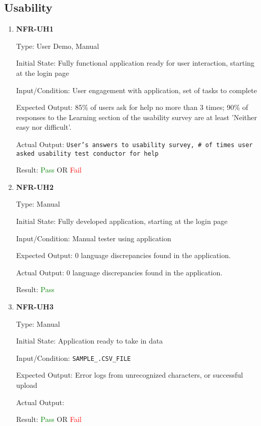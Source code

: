 \documentclass[12pt, titlepage]{article}
\begin{document}
\subsection{Usability}
\begin{enumerate}
\item{\textbf{NFR-UH1}} \label{NFR:UH1}

Type: User Demo, Manual

Initial State: Fully functional application ready for user interaction, starting
at the login page

Input/Condition: User engagement with application, set of tasks to complete

Expected Output: 85\% of users ask for help no more than 3 times; 90\% of
responses to the Learning section of the usability survey are at least 'Neither
easy nor difficult'.

Actual Output: \texttt{User's answers to usability survey, \# of times user
asked usability test conductor for help}

Result: \textcolor{green}{Pass} OR \textcolor{red}{Fail}

\item{\textbf{NFR-UH2}} \label{NFR:UH2}

Type: Manual
  
Initial State: Fully developed application, starting at the login page
  
Input/Condition: Manual tester using application

Expected Output: 0 language discrepancies found in the application.
  
Actual Output: 0 language discrepancies found in the application.

Result: \textcolor{green}{Pass}

\item{\textbf{NFR-UH3}} \label{NFR:UH3}

Type: Manual

Initial State: Application ready to take in data

Input/Condition: \texttt{SAMPLE\_.CSV\_FILE}

Expected Output: Error logs from unrecognized characters, or successful upload

Actual Output:

Result: \textcolor{green}{Pass} OR \textcolor{red}{Fail}


\end{enumerate}
\end{document}
